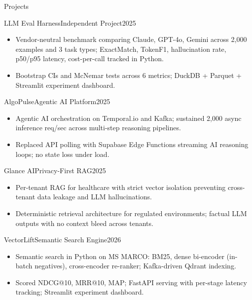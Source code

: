 \documentclass[]{mcdowellcv}
\begin{document}
\begin{cvsection}{Projects}
  \begin{cvsubsection}{LLM Eval Harness}{Independent Project}{2025}
    \begin{itemize}
      \item Vendor-neutral benchmark comparing Claude, GPT-4o, Gemini across 2,000 examples and 3 task types; ExactMatch, TokenF1, hallucination rate, p50/p95 latency, cost-per-call tracked in Python.
      \item Bootstrap CIs and McNemar tests across 6 metrics; DuckDB + Parquet + Streamlit experiment dashboard.
    \end{itemize}
    \vspace{-1.5pt}
  \end{cvsubsection}

  \begin{cvsubsection}{AlgoPulse}{Agentic AI Platform}{2025}
    \begin{itemize}
      \item Agentic AI orchestration on Temporal.io and Kafka; sustained 2,000 async inference req/sec across multi-step reasoning pipelines.
      \item Replaced API polling with Supabase Edge Functions streaming AI reasoning loops; no state loss under load.
    \end{itemize}
    \vspace{-1.5pt}
  \end{cvsubsection}

  \begin{cvsubsection}{Glance AI}{Privacy-First RAG}{2025}
    \begin{itemize}
      \item Per-tenant RAG for healthcare with strict vector isolation preventing cross-tenant data leakage and LLM hallucinations.
      \item Deterministic retrieval architecture for regulated environments; factual LLM outputs with no context bleed across tenants.
    \end{itemize}
    \vspace{-1.5pt}
  \end{cvsubsection}

  \begin{cvsubsection}{VectorLift}{Semantic Search Engine}{2026}
    \begin{itemize}
      \item Semantic search in Python on MS MARCO: BM25, dense bi-encoder (in-batch negatives), cross-encoder re-ranker; Kafka-driven Qdrant indexing.
      \item Scored NDCG@10, MRR@10, MAP; FastAPI serving with per-stage latency tracking; Streamlit experiment dashboard.
    \end{itemize}
  \end{cvsubsection}
\end{cvsection}
\end{document}
